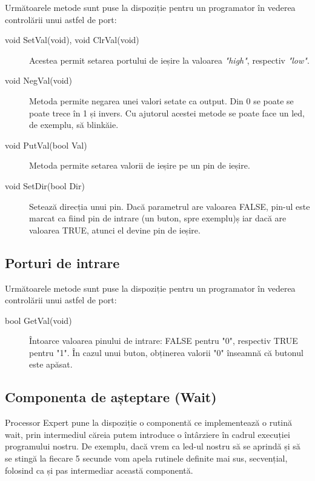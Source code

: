 Următoarele metode sunt puse la dispoziție pentru un programator în vederea controlării unui astfel de port:
\begin{description}
    \item[void SetVal(void), void ClrVal(void)] Acestea permit setarea portului de ieșire la valoarea \textit{"high"}, respectiv \textit{"low"}. 
    \item[void NegVal(void)] Metoda permite negarea unei valori setate ca output. Din 0 se poate se poate trece în 1 și invers. Cu ajutorul acestei metode se poate face un led, de exemplu, să blinkăie.
    \item[void PutVal(bool Val)] Metoda permite setarea valorii de ieșire pe un pin de ieșire.
    \item[void SetDir(bool Dir)] Setează direcția unui pin. Dacă parametrul are valoarea FALSE, pin-ul este marcat ca fiind pin de intrare (un buton, spre exemplu)ș iar dacă are valoarea TRUE, atunci el devine pin de ieșire.
\end{description}



\subsection{Porturi de intrare}

Următoarele metode sunt puse la dispoziție pentru un programator în vederea controlării unui astfel de port:

\begin{description}
    \item[bool GetVal(void)] Întoarce valoarea pinului de intrare: FALSE pentru "0", respectiv TRUE pentru "1". În cazul unui buton, obținerea valorii "0" înseamnă că butonul este apăsat.
\end{description}



\subsection{Componenta de așteptare (Wait)}

Processor Expert pune la dispoziție o componentă ce implementează o rutină wait, prin intermediul căreia putem introduce o întârziere în cadrul execuției programului nostru. De exemplu, dacă vrem ca led-ul nostru să se aprindă și să se stingă la fiecare 5 secunde vom apela rutinele definite mai sus, secvențial, folosind ca și pas intermediar această componentă.

